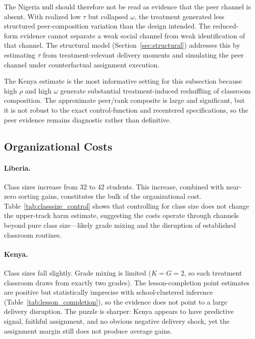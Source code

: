 \documentclass[11pt]{article}
\begin{document}
The Nigeria null should therefore not be read as evidence that the peer channel is absent. With realized low $\tau$ but collapsed $\omega$, the treatment generated less structured peer-composition variation than the design intended. The reduced-form evidence cannot separate a weak social channel from weak identification of that channel. The structural model (Section~\ref{sec:structural}) addresses this by estimating $\tau$ from treatment-relevant delivery moments and simulating the peer channel under counterfactual assignment execution.

The Kenya estimate is the most informative setting for this subsection because high $\rho$ and high $\omega$ generate substantial treatment-induced reshuffling of classroom composition. The approximate peer/rank composite is large and significant, but it is not robust to the exact control-function and recentered specifications, so the peer evidence remains diagnostic rather than definitive.

\subsection{Organizational Costs}

\paragraph{Liberia.} Class sizes increase from 32 to 42 students. This increase, combined with near-zero sorting gains, constitutes the bulk of the organizational cost. Table~\ref{tab:classsize_control} shows that controlling for class size does not change the upper-track harm estimate, suggesting the costs operate through channels beyond pure class size---likely grade mixing and the disruption of established classroom routines.

\paragraph{Kenya.} Class sizes fall slightly. Grade mixing is limited ($K = G = 2$, so each treatment classroom draws from exactly two grades). The lesson-completion point estimates are positive but statistically imprecise with school-clustered inference (Table~\ref{tab:lesson_completion}), so the evidence does not point to a large delivery disruption. The puzzle is sharper: Kenya appears to have predictive signal, faithful assignment, and no obvious negative delivery shock, yet the assignment margin still does not produce average gains.
\end{document}
